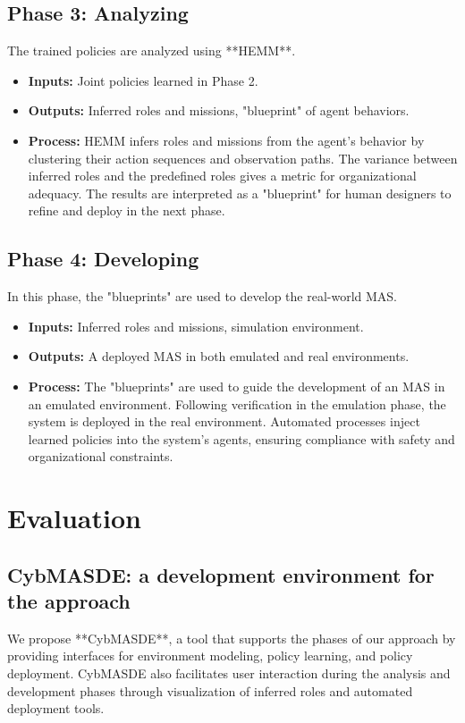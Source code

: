 \documentclass[sigconf,anonymous]{aamas}
\begin{document}
\subsection{Phase 3: Analyzing}
The trained policies are analyzed using **HEMM**.
\begin{itemize}
    \item \textbf{Inputs:} Joint policies learned in Phase 2.
    \item \textbf{Outputs:} Inferred roles and missions, "blueprint" of agent behaviors.
    \item \textbf{Process:} HEMM infers roles and missions from the agent's behavior by clustering their action sequences and observation paths. The variance between inferred roles and the predefined roles gives a metric for organizational adequacy. The results are interpreted as a "blueprint" for human designers to refine and deploy in the next phase.
\end{itemize}

\subsection{Phase 4: Developing}
In this phase, the "blueprints" are used to develop the real-world MAS.
\begin{itemize}
    \item \textbf{Inputs:} Inferred roles and missions, simulation environment.
    \item \textbf{Outputs:} A deployed MAS in both emulated and real environments.
    \item \textbf{Process:} The "blueprints" are used to guide the development of an MAS in an emulated environment. Following verification in the emulation phase, the system is deployed in the real environment. Automated processes inject learned policies into the system’s agents, ensuring compliance with safety and organizational constraints.
\end{itemize}

\section{Evaluation}

\subsection{CybMASDE: a development environment for the approach}
We propose **CybMASDE**, a tool that supports the phases of our approach by providing interfaces for environment modeling, policy learning, and policy deployment. CybMASDE also facilitates user interaction during the analysis and development phases through visualization of inferred roles and automated deployment tools.
\end{document}
